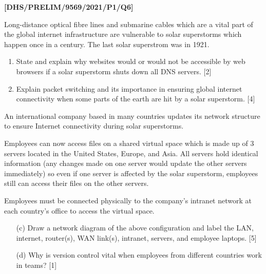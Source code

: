 \item \textbf{{[}DHS/PRELIM/9569/2021/P1/Q6{]} }

Long-distance optical fibre lines and submarine cables which are a
vital part of the global internet infrastructure are vulnerable to
solar superstorms which happen once in a century. The last solar superstrom
was in 1921. 
\begin{enumerate}
\item State and explain why websites would or would not be accessible by
web browsers if a solar superstorm shuts down all DNS servers. \hfill{}{[}2{]}
\item Explain packet switching and its importance in ensuring global internet
connectivity when some parts of the earth are hit by a solar superstorm.
\hfill{}{[}4{]}
\end{enumerate}
An international company based in many countries updates its network
structure to ensure Internet connectivity during solar superstorms. 

Employees can now access files on a shared virtual space which is
made up of 3 servers located in the United States, Europe, and Asia.
All servers hold identical information (any changes made on one server
would update the other servers immediately) so even if one server
is affected by the solar superstorm, employees still can access their
files on the other servers. 

Employees must be connected physically to the company\textquoteright s
intranet network at each country\textquoteright s office to access
the virtual space. 
\begin{enumerate}
\item[(c)] Draw a network diagram of the above configuration and label the LAN,
internet, router(s), WAN link(s), intranet, servers, and employee
laptops. \hfill{}{[}5{]}
\item[(d)] Why is version control vital when employees from different countries
work in teams? \hfill{}{[}1{]}
\end{enumerate}
